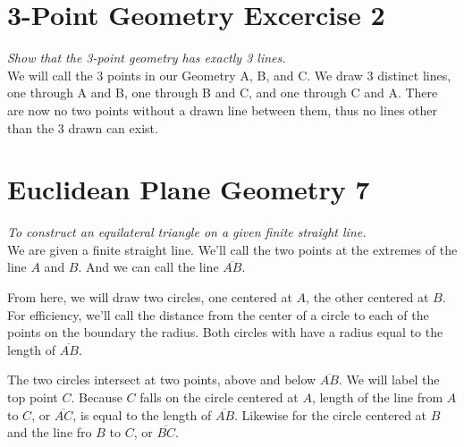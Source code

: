 \documentclass[12pt]{article}
\begin{document}
\newpage
\section{3-Point Geometry Excercise 2}
\textit{Show that the 3-point geometry has exactly 3 lines.}
\\

We will call the 3 points in our Geometry A, B, and C. We draw 3 distinct lines, one through A and B, one through B and C, and one through C and A. There are now no two points without a drawn line between them, thus no lines other than the 3 drawn can exist.

\section{Euclidean Plane Geometry 7}
\textit{To construct an equilateral triangle on a given finite straight line.}
\\

We are given a finite straight line. We’ll call the two points at the extremes of the line $A$ and $B$. And we can call the line $\overline{AB}$.

\begin{center}
\end{center}

From here, we will draw two circles, one centered at $A$, the other centered at $B$. For efficiency, we’ll call the distance from the center of a circle to each of the points on the boundary the radius. Both circles with have a radius equal to the length of $\overline{AB}$.

\begin{center}
\end{center}

The two circles intersect at two points, above and below $\overline{AB}$. We will label the top point $C$. Because $C$ falls on the circle centered at $A$, length of the line from $A$ to $C$, or $\overline{AC}$, is equal to the length of $\overline{AB}$. Likewise for the circle centered at $B$ and the line fro $B$ to $C$, or $\overline{BC}$.
\end{document}
